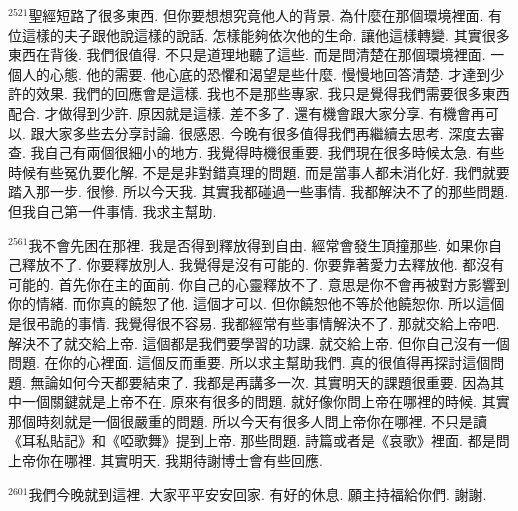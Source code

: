 \documentclass{book}
\begin{document}
$^{2521}$聖經短路了很多東西.
但你要想想究竟他人的背景.
為什麼在那個環境裡面.
有位這樣的夫子跟他說這樣的說話.
怎樣能夠依次他的生命.
讓他這樣轉變.
其實很多東西在背後.
我們很值得.
不只是道理地聽了這些.
而是問清楚在那個環境裡面.
一個人的心態.
他的需要.
他心底的恐懼和渴望是些什麼.
慢慢地回答清楚.
才達到少許的效果.
我們的回應會是這樣.
我也不是那些專家.
我只是覺得我們需要很多東西配合.
才做得到少許.
原因就是這樣.
差不多了.
還有機會跟大家分享.
有機會再可以.
跟大家多些去分享討論.
很感恩.
今晚有很多值得我們再繼續去思考.
深度去審查.
我自己有兩個很細小的地方.
我覺得時機很重要.
我們現在很多時候太急.
有些時候有些冤仇要化解.
不是是非對錯真理的問題.
而是當事人都未消化好.
我們就要踏入那一步.
很慘.
所以今天我.
其實我都碰過一些事情.
我都解決不了的那些問題.
但我自己第一件事情.
我求主幫助.

$^{2561}$我不會先困在那裡.
我是否得到釋放得到自由.
經常會發生頂撞那些.
如果你自己釋放不了.
你要釋放別人.
我覺得是沒有可能的.
你要靠著愛力去釋放他.
都沒有可能的.
首先你在主的面前.
你自己的心靈釋放不了.
意思是你不會再被對方影響到你的情緒.
而你真的饒恕了他.
這個才可以.
但你饒恕他不等於他饒恕你.
所以這個是很弔詭的事情.
我覺得很不容易.
我都經常有些事情解決不了.
那就交給上帝吧.
解決不了就交給上帝.
這個都是我們要學習的功課.
就交給上帝.
但你自己沒有一個問題.
在你的心裡面.
這個反而重要.
所以求主幫助我們.
真的很值得再探討這個問題.
無論如何今天都要結束了.
我都是再講多一次.
其實明天的課題很重要.
因為其中一個關鍵就是上帝不在.
原來有很多的問題.
就好像你問上帝在哪裡的時候.
其實那個時刻就是一個很嚴重的問題.
所以今天有很多人問上帝你在哪裡.
不只是讀《耳私貼記》和《啞歌舞》提到上帝.
那些問題.
詩篇或者是《哀歌》裡面.
都是問上帝你在哪裡.
其實明天.
我期待謝博士會有些回應.

$^{2601}$我們今晚就到這裡.
大家平平安安回家.
有好的休息.
願主持福給你們.
謝謝.
\newpage
\end{document}
